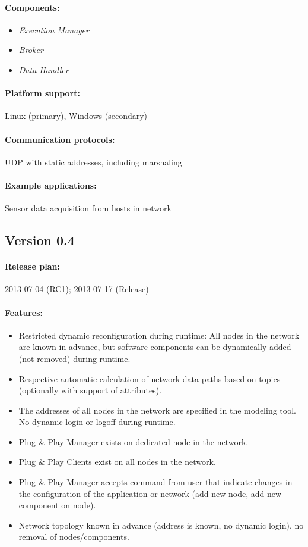 \paragraph{Components:}
\begin{itemize}
	\item \emph{Execution Manager}
	\item \emph{Broker}
	\item \emph{Data Handler}
\end{itemize}

\paragraph{Platform support:} Linux (primary), Windows (secondary)
\paragraph{Communication protocols:} UDP with static addresses, including marshaling
\paragraph{Example applications:} Sensor data acquisition from hosts in network



\subsection{Version 0.4}

\paragraph{Release plan:} 2013-07-04 (RC1); 2013-07-17 (Release)

\paragraph{Features:}
\begin{itemize}
	\item Restricted dynamic reconfiguration during runtime: All nodes in the network are known in advance, but software components can be dynamically added (not removed) during runtime.
	\item Respective automatic calculation of network data paths based on topics (optionally with support of attributes).
	\item The addresses of all nodes in the network are specified in the modeling tool. No dynamic login or logoff during runtime.
	\item Plug \& Play Manager exists on dedicated node in the network.
	\item Plug \& Play Clients exist on all nodes in the network.
	\item Plug \& Play Manager accepts command from user that indicate changes in the configuration of the application or network (add new node, add new component on node).
	\item Network topology known in advance (address is known, no dynamic login), no removal of nodes/components.
\end{itemize}

